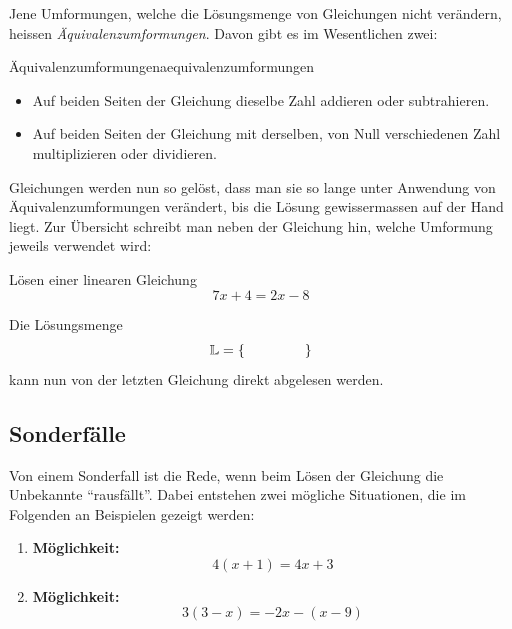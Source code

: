 Jene Umformungen, welche die Lösungsmenge von Gleichungen nicht verändern, heissen \textit{Äquivalenzumformungen}. Davon gibt es im Wesentlichen zwei:
\begin{satz}{Äquivalenzumformungen}{aequivalenzumformungen}

    \begin{itemize}
        \item Auf beiden Seiten der Gleichung dieselbe Zahl addieren oder subtrahieren.
        \item Auf beiden Seiten der Gleichung mit derselben, von Null verschiedenen Zahl multiplizieren oder dividieren.
    \end{itemize}
\end{satz}

Gleichungen werden nun so gelöst, dass man sie so lange unter Anwendung von Äquivalenzumformungen verändert, bis die Lösung gewissermassen auf der Hand liegt. Zur Übersicht schreibt man neben der Gleichung hin, welche Umformung jeweils verwendet wird:

\begin{bsp}{Lösen einer linearen Gleichung}{}
    \[
        7x+4=2x-8
    \]

    \vspace{3cm}

    Die Lösungsmenge
    \[
        \mathbb{L}=\left\{\hspace{1.5cm}\right\}
    \]
    kann nun von der letzten Gleichung direkt abgelesen werden.
\end{bsp}

\subsection*{Sonderfälle}

Von einem Sonderfall ist die Rede, wenn beim Lösen der Gleichung die Unbekannte ``rausfällt''. Dabei entstehen zwei mögliche Situationen, die im Folgenden an Beispielen gezeigt werden:

\begin{enumerate}
    \item \textbf{Möglichkeit:}
          \[
              4(x+1)=4x+3
          \]

          \vspace{3cm}

    \item \textbf{Möglichkeit:}
          \[
              3(3-x)=-2x-(x-9)
          \]

          \vspace{3cm}
\end{enumerate}

